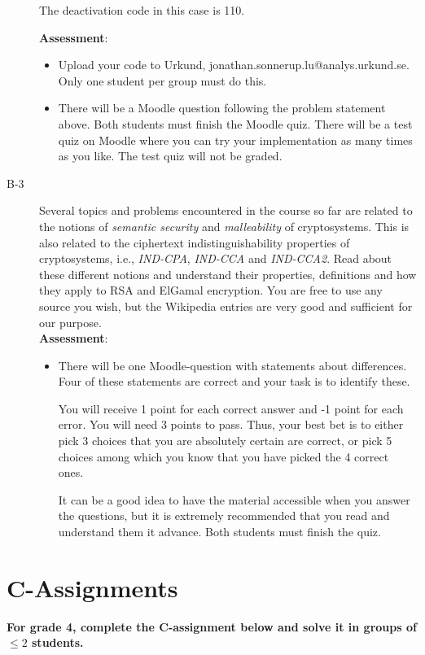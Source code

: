 \documentclass{article}
\begin{document}
\begin{description}
{			The deactivation code in this case is 110.
			
			\textbf{Assessment}:
			\begin{itemize}
				\item Upload your code to Urkund, jonathan.sonnerup.lu@analys.urkund.se. Only one student per group must do this.
				\item There will be a Moodle question following the problem statement above. Both students must finish the Moodle quiz. There will be	a test quiz on Moodle where you can try your implementation as many times as you like. The test quiz will not be graded.
			\end{itemize}}
			
			\item[B-3]{Several topics and problems encountered in the course so far are related to the notions of \textit{semantic security} and \textit{malleability} of cryptosystems. This is also related to the ciphertext indistinguishability properties of cryptosystems, i.e., \textit{IND-CPA}, \textit{IND-CCA} and \textit{IND-CCA2}. Read about these different notions and understand their properties, definitions and how they apply to RSA and ElGamal encryption. You are free to use any source you wish, but the Wikipedia entries are very good and sufficient for our purpose.\\
				\textbf{Assessment}:
				\begin{itemize}
					\item There will be one Moodle-question with statements about differences. Four of these statements are correct and your task is to identify these.  
					
					You will receive 1 point for each correct answer and -1 point for each error. You will need 3 points to pass. Thus, your best bet is to either pick 3 choices that you are absolutely certain are correct, or pick 5 choices among which you know that you have picked the 4 correct ones.
					
					It can be a good idea to have the material accessible when you answer the questions, but it is extremely recommended that you read and understand them it advance. Both students must finish the quiz.
				\end{itemize}}
				
				
			\end{description}
		
			\clearpage

			\section*{C-Assignments}
			\textbf{For grade 4, complete the C-assignment below and solve it in groups of $\leq 2$ students.}
			
\end{document}
